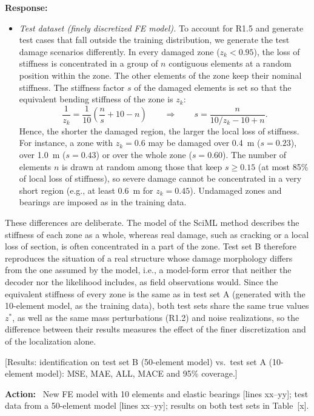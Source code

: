\documentclass[11pt]{article}
\newenvironment{response}{\par\smallskip\noindent\color{resp}\textbf{Response:}\ }{\par}
\newenvironment{action}{\par\smallskip\noindent\color{resp}\textbf{Action:}\ }{\par}
\newcommand{\tbd}[1]{\textcolor{note}{\textsf{[#1]}}}
\newcommand{\lines}[1]{\tbd{lines #1}}
\begin{document}
\begin{response}
\begin{itemize}[leftmargin=*]
\item \emph{Test dataset (finely discretized FE model).} To account for R1.5 and generate test cases that fall outside the training distribution, we generate the test damage scenarios differently. In every damaged zone ($z_k<0.95$), the loss of stiffness is concentrated in a group of $n$ contiguous elements at a random position within the zone. The other elements of the zone keep their nominal stiffness. The stiffness factor $s$ of the damaged elements is set so that the equivalent bending stiffness of the zone is $z_k$:
\begin{equation}
\frac{1}{z_k}=\frac{1}{10}\left(\frac{n}{s}+10-n\right)\qquad\Longrightarrow\qquad s=\frac{n}{10/z_k-10+n}.
\label{eq:localized}
\end{equation}
Hence, the shorter the damaged region, the larger the local loss of stiffness. For instance, a zone with $z_k=0.6$ may
be damaged over 0.4~m ($s=0.23$), over 1.0~m ($s=0.43$) or over the whole zone ($s=0.60$). The number of elements $n$ is
drawn at random among those that keep $s\ge0.15$ (at most 85\% of local loss of stiffness), so severe damage cannot be
concentrated in a very short region (e.g., at least 0.6~m for $z_k=0.45$). Undamaged zones and bearings are imposed as in
the training data.
\end{itemize}
These differences are deliberate. The model of the SciML method describes the stiffness of each zone as a whole, whereas
real damage, such as cracking or a local loss of section, is often concentrated in a part of the zone. Test set B
therefore reproduces the situation of a real structure whose damage morphology differs from the one assumed by the model,
i.e., a model-form error that neither the decoder nor the likelihood includes, as field observations would. Since the
equivalent stiffness of every zone is the same as in test set A (generated with the 10-element model, as the training
data), both test sets share the same true values $z^*$, as well as the same mass perturbations (R1.2) and noise
realizations, so the difference between their results measures the effect of the finer discretization and of the
localization alone. 

\tbd{Results: identification on test set B (50-element model) vs.\ test set A (10-element model): MSE, MAE, ALL, MACE and
95\% coverage.}
\end{response}

\begin{action}
New FE model with 10 elements and elastic bearings \lines{xx--yy}; test data from a 50-element model
\lines{xx--yy}; results on both test sets in Table~\tbd{x}.
\end{action}
\end{document}
